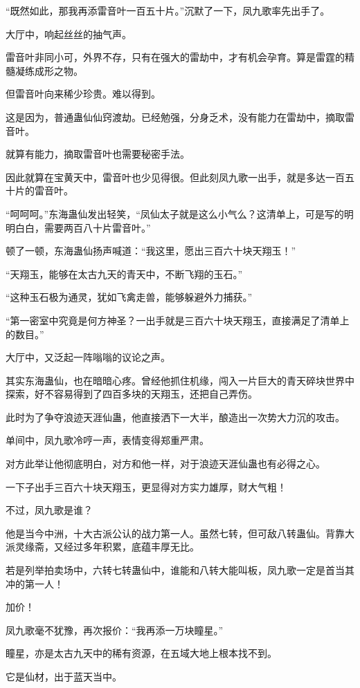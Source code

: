 \begin{this_body}
“既然如此，那我再添雷音叶一百五十片。”沉默了一下，凤九歌率先出手了。

大厅中，响起丝丝的抽气声。

雷音叶非同小可，外界不存，只有在强大的雷劫中，才有机会孕育。算是雷霆的精髓凝练成形之物。

但雷音叶向来稀少珍贵。难以得到。

这是因为，普通蛊仙仙窍渡劫。已经勉强，分身乏术，没有能力在雷劫中，摘取雷音叶。

就算有能力，摘取雷音叶也需要秘密手法。

因此就算在宝黄天中，雷音叶也少见得很。但此刻凤九歌一出手，就是多达一百五十片的雷音叶。

“呵呵呵。”东海蛊仙发出轻笑，“凤仙太子就是这么小气么？这清单上，可是写的明明白白，需要两百八十片雷音叶。”

顿了一顿，东海蛊仙扬声喊道：“我这里，愿出三百六十块天翔玉！”

“天翔玉，能够在太古九天的青天中，不断飞翔的玉石。”

“这种玉石极为通灵，犹如飞禽走兽，能够躲避外力捕获。”

“第一密室中究竟是何方神圣？一出手就是三百六十块天翔玉，直接满足了清单上的数目。”

大厅中，又泛起一阵嗡嗡的议论之声。

其实东海蛊仙，也在暗暗心疼。曾经他抓住机缘，闯入一片巨大的青天碎块世界中探索，好不容易得到了四百多块的天翔玉，还把自己弄伤。

此时为了争夺浪迹天涯仙蛊，他直接洒下一大半，酿造出一次势大力沉的攻击。

单间中，凤九歌冷哼一声，表情变得郑重严肃。

对方此举让他彻底明白，对方和他一样，对于浪迹天涯仙蛊也有必得之心。

一下子出手三百六十块天翔玉，更显得对方实力雄厚，财大气粗！

不过，凤九歌是谁？

他是当今中洲，十大古派公认的战力第一人。虽然七转，但可敌八转蛊仙。背靠大派灵缘斋，又经过多年积累，底蕴丰厚无比。

若是列举拍卖场中，六转七转蛊仙中，谁能和八转大能叫板，凤九歌一定是首当其冲的第一人！

加价！

凤九歌毫不犹豫，再次报价：“我再添一万块瞳星。”

瞳星，亦是太古九天中的稀有资源，在五域大地上根本找不到。

它是仙材，出于蓝天当中。


\end{this_body}
